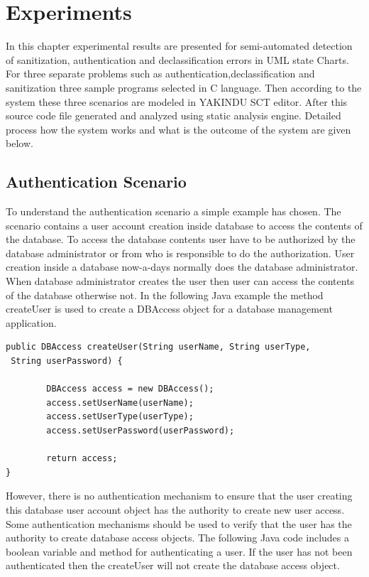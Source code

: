 \chapter{Experiments}
In this chapter experimental results are presented for semi-automated detection of sanitization, authentication and declassification errors in UML state Charts. For three separate problems such as authentication,declassification and sanitization three sample programs selected in C language. Then according to the system these three scenarios are modeled in YAKINDU SCT editor. After this source code file generated and analyzed using static analysis engine. Detailed process how the system works and what is the outcome of the system are given below.

\section{Authentication Scenario}

To understand the authentication scenario a simple example has chosen. The scenario contains a user account creation inside database to access the contents of the database. To access the database contents user have to be authorized by the database administrator or from who is responsible to do the authorization. User creation inside a database now-a-days normally does the database administrator. When database administrator creates the user then user can access the contents of the database otherwise not. In the following Java example the method createUser is used to create a DBAccess object for a database management application.

\begin{lstlisting}
public DBAccess createUser(String userName, String userType,
 String userPassword) {

		DBAccess access = new DBAccess();
		access.setUserName(userName);
		access.setUserType(userType);
		access.setUserPassword(userPassword);	
				
		return access;
}

\end{lstlisting}

However, there is no authentication mechanism to ensure that the user creating this database user account object has the authority to create new user access. Some authentication mechanisms should be used to verify that the user has the authority to create database access objects.
The following Java code includes a boolean variable and method for authenticating a user. If the user has not been authenticated then the createUser will not create the database access object.

